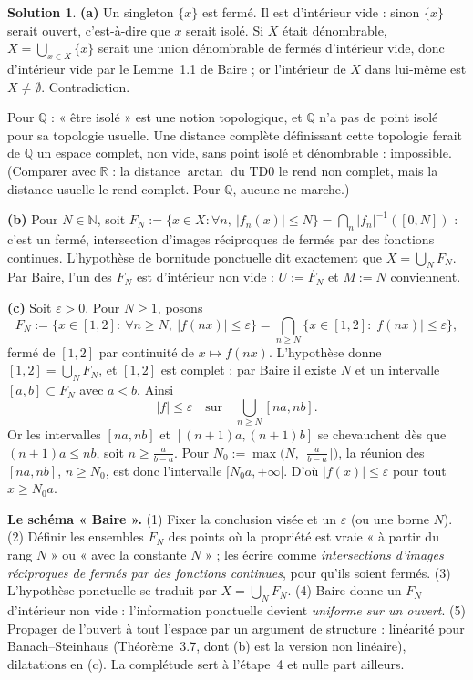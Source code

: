 \documentclass[11pt,a4paper]{article}
\newcommand{\R}{\mathbb{R}}
\newcommand{\N}{\mathbb{N}}
\newcommand{\Q}{\mathbb{Q}}
\newcommand{\interieur}[1]{\mathring{#1}}
\theoremstyle{definition}
\newtheorem*{solution}{Solution}
\begin{document}
\begin{solution}
\noindent\textbf{(a)} Un singleton $\{x\}$ est fermé. Il est d'intérieur vide : sinon $\{x\}$ serait ouvert, c'est-à-dire que $x$ serait isolé. Si $X$ était dénombrable, $X=\bigcup_{x\in X}\{x\}$ serait une union dénombrable de fermés d'intérieur vide, donc d'intérieur vide par le Lemme~1.1 de Baire ; or l'intérieur de $X$ dans lui-même est $X\ne\emptyset$. Contradiction.

Pour $\Q$ : « être isolé » est une notion topologique, et $\Q$ n'a pas de point isolé pour sa topologie usuelle. Une distance complète définissant cette topologie ferait de $\Q$ un espace complet, non vide, sans point isolé et dénombrable : impossible. (Comparer avec $\R$ : la distance $\arctan$ du TD0 le rend non complet, mais la distance usuelle le rend complet. Pour $\Q$, aucune ne marche.)

\medskip
\noindent\textbf{(b)} Pour $N\in\N$, soit $F_N:=\{x\in X:\forall n,\ |f_n(x)|\le N\}=\bigcap_n|f_n|^{-1}([0,N])$ : c'est un fermé, intersection d'images réciproques de fermés par des fonctions continues. L'hypothèse de bornitude ponctuelle dit exactement que $X=\bigcup_NF_N$. Par Baire, l'un des $F_N$ est d'intérieur non vide : $U:=\interieur{F_N}$ et $M:=N$ conviennent.

\medskip
\noindent\textbf{(c)} Soit $\varepsilon>0$. Pour $N\ge1$, posons
\[
F_N:=\{x\in[1,2]:\ \forall n\ge N,\ |f(nx)|\le\varepsilon\}=\bigcap_{n\ge N}\{x\in[1,2]:|f(nx)|\le\varepsilon\},
\]
fermé de $[1,2]$ par continuité de $x\mapsto f(nx)$. L'hypothèse donne $[1,2]=\bigcup_NF_N$, et $[1,2]$ est complet : par Baire il existe $N$ et un intervalle $[a,b]\subset F_N$ avec $a<b$. Ainsi
\[
|f|\le\varepsilon\quad\text{sur}\quad\bigcup_{n\ge N}[na,nb] .
\]
Or les intervalles $[na,nb]$ et $[(n+1)a,(n+1)b]$ se chevauchent dès que $(n+1)a\le nb$, soit $n\ge\frac a{b-a}$. Pour $N_0:=\max\big(N,\lceil\frac a{b-a}\rceil\big)$, la réunion des $[na,nb]$, $n\ge N_0$, est donc l'intervalle $[N_0a,+\infty[$. D'où $|f(x)|\le\varepsilon$ pour tout $x\ge N_0a$.
\end{solution}

\begin{methode}
\textbf{Le schéma « Baire ».} (1) Fixer la conclusion visée et un $\varepsilon$ (ou une borne $N$). (2) Définir les ensembles $F_N$ des points où la propriété est vraie « à partir du rang $N$ » ou « avec la constante $N$ » ; les écrire comme \emph{intersections d'images réciproques de fermés par des fonctions continues}, pour qu'ils soient fermés. (3) L'hypothèse ponctuelle se traduit par $X=\bigcup_NF_N$. (4) Baire donne un $F_N$ d'intérieur non vide : l'information ponctuelle devient \emph{uniforme sur un ouvert}. (5) Propager de l'ouvert à tout l'espace par un argument de structure : linéarité pour Banach--Steinhaus (Théorème~3.7, dont (b) est la version non linéaire), dilatations en (c). La complétude sert à l'étape~4 et nulle part ailleurs.
\end{methode}
\end{document}
